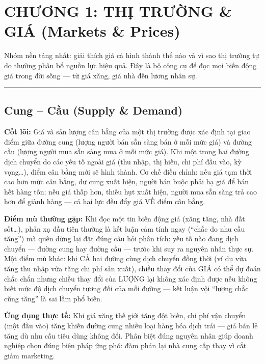\documentclass[
]{article}
\begin{document}
\section{CHƯƠNG 1: THỊ TRƯỜNG \& GIÁ (Markets \&
Prices)}\label{chux1b0ux1a1ng-1-thux1ecb-trux1b0ux1eddng-giuxe1-markets-prices}

Nhóm nền tảng nhất: giải thích giá cả hình thành thế nào và vì sao thị
trường tự do thường phân bổ nguồn lực hiệu quả. Đây là bộ công cụ để đọc
mọi biến động giá trong đời sống --- từ giá xăng, giá nhà đến lương nhân
sự.

\begin{center}\rule{0.5\linewidth}{0.5pt}\end{center}

\subsection{Cung -- Cầu (Supply \&
Demand)}\label{cung-cux1ea7u-supply-demand}

\textbf{Cốt lõi:} Giá và sản lượng cân bằng của một thị trường được xác
định tại giao điểm giữa đường cung (lượng người bán sẵn sàng bán ở mỗi
mức giá) và đường cầu (lượng người mua sẵn sàng mua ở mỗi mức giá). Khi
một trong hai đường dịch chuyển do các yếu tố ngoài giá (thu nhập, thị
hiếu, chi phí đầu vào, kỳ vọng\ldots), điểm cân bằng mới sẽ hình thành.
Cơ chế điều chỉnh: nếu giá tạm thời cao hơn mức cân bằng, dư cung xuất
hiện, người bán buộc phải hạ giá để bán hết hàng tồn; nếu giá thấp hơn,
thiếu hụt xuất hiện, người mua sẵn sàng trả cao hơn để giành hàng --- cả
hai lực đều đẩy giá VỀ điểm cân bằng.

\textbf{Điểm mù thường gặp:} Khi đọc một tin biến động giá (xăng tăng,
nhà đất sốt\ldots), phản xạ đầu tiên thường là kết luận cảm tính ngay
(``chắc do nhu cầu tăng'') mà quên dừng lại đặt đúng câu hỏi phân tích:
yếu tố nào đang dịch chuyển --- đường cung hay đường cầu --- trước khi
suy ra nguyên nhân thực sự. Một điểm mù khác: khi CẢ hai đường cùng dịch
chuyển đồng thời (ví dụ vừa tăng thu nhập vừa tăng chi phí sản xuất),
chiều thay đổi của GIÁ có thể dự đoán chắc chắn nhưng chiều thay đổi của
LƯỢNG lại không xác định được nếu không biết mức độ dịch chuyển tương
đối của mỗi đường --- kết luận vội ``lượng chắc cũng tăng'' là sai lầm
phổ biến.

\textbf{Ứng dụng thực tế:} Khi giá xăng thế giới tăng đột biến, chi phí
vận chuyển (một đầu vào) tăng khiến đường cung nhiều loại hàng hóa dịch
trái --- giá bán lẻ tăng dù nhu cầu tiêu dùng không đổi. Phân biệt đúng
nguyên nhân giúp doanh nghiệp chọn đúng biện pháp ứng phó: đàm phán lại
nhà cung cấp thay vì cắt giảm marketing.
\end{document}
